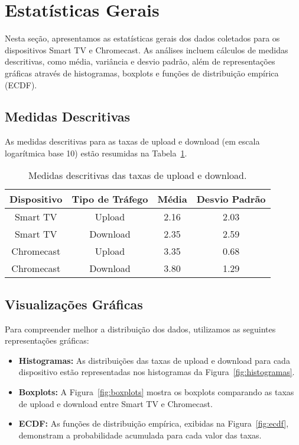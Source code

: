 \section{Estatísticas Gerais}

Nesta seção, apresentamos as estatísticas gerais dos dados coletados para os dispositivos Smart TV e Chromecast. As análises incluem cálculos de medidas descritivas, como média, variância e desvio padrão, além de representações gráficas através de histogramas, boxplots e funções de distribuição empírica (ECDF). 

\subsection{Medidas Descritivas}

As medidas descritivas para as taxas de upload e download (em escala logarítmica base 10) estão resumidas na Tabela~\ref{tab:estatisticas}. 

\begin{table}[H]
\centering
\caption{Medidas descritivas das taxas de upload e download.}
\label{tab:estatisticas}
\begin{tabular}{|c|c|c|c|}
\hline
\textbf{Dispositivo} & \textbf{Tipo de Tráfego} & \textbf{Média} & \textbf{Desvio Padrão} \\ \hline
Smart TV & Upload & 2.16 & 2.03 \\ \hline
Smart TV & Download & 2.35 & 2.59 \\ \hline
Chromecast & Upload & 3.35 & 0.68 \\ \hline
Chromecast & Download & 3.80 & 1.29 \\ \hline
\end{tabular}
\end{table}

\subsection{Visualizações Gráficas}

Para compreender melhor a distribuição dos dados, utilizamos as seguintes representações gráficas:

\begin{itemize}
    \item \textbf{Histogramas:} As distribuições das taxas de upload e download para cada dispositivo estão representadas nos histogramas da Figura~\ref{fig:histogramas}.
    \item \textbf{Boxplots:} A Figura~\ref{fig:boxplots} mostra os boxplots comparando as taxas de upload e download entre Smart TV e Chromecast.
    \item \textbf{ECDF:} As funções de distribuição empírica, exibidas na Figura~\ref{fig:ecdf}, demonstram a probabilidade acumulada para cada valor das taxas.
\end{itemize}

